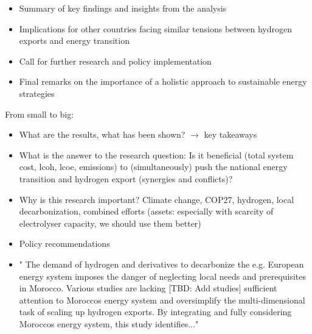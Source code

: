\begin{itemize}
    \item Summary of key findings and insights from the analysis
    \item Implications for other countries facing similar tensions between hydrogen exports and energy transition
    \item Call for further research and policy implementation
    \item Final remarks on the importance of a holistic approach to sustainable energy strategies
\end{itemize}

From small to big:
\begin{itemize}
    \item What are the results, what has been shown? $\rightarrow$ key takeaways
    \item What is the answer to the research question: Is it beneficial (total system cost, lcoh, lcoe, emissions)
    to (simultaneously) push the national energy transition
    and hydrogen export (synergies and conflicts)?
    \item Why is this research important? Climate change, COP27, hydrogen, local decarbonization, combined efforts (assets: especially with scarcity of electrolyser capacity, we should use them better)
    \item Policy recommendations
    \item " The demand of hydrogen and derivatives to decarbonize the e.g. European energy system imposes the danger of neglecting local needs and prerequisites in Morocco. Various studies are lacking [TBD: Add studies] sufficient attention to Moroccos energy system and oversimplify the multi-dimensional task of scaling up hydrogen exports. 
    By integrating and fully considering Moroccos energy system, this study identifies..."
\end{itemize}
